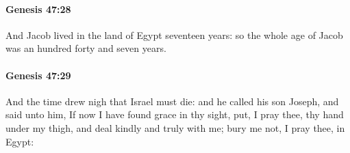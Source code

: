		\paragraph{Genesis 47:28} %
			\label{GENESIS-47-28}

			And Jacob lived in the land of Egypt seventeen years: so the whole age of Jacob was an hundred forty and seven years.


		\paragraph{Genesis 47:29} %
			\label{GENESIS-47-29}

			And the time drew nigh that Israel must die: and he called his son Joseph, and said unto him, If now I have found grace in thy sight, put, I pray thee, thy hand under my thigh, and deal kindly and truly with me; bury me not, I pray thee, in Egypt:


